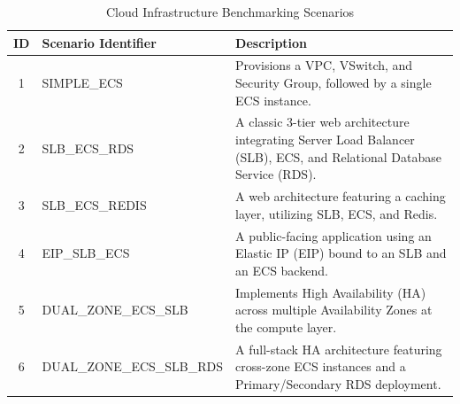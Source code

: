 \documentclass{article}
\theoremstyle{plain}
\theoremstyle{definition}
\theoremstyle{remark}
\begin{document}
\begin{table}[H]
\centering
\small
\renewcommand{\arraystretch}{1.3}
\begin{tabular}{|c|l|p{8.5cm}|}
\hline
\textbf{ID} & \textbf{Scenario Identifier} & \textbf{Description} \\ \hline
1 & SIMPLE\_ECS & Provisions a VPC, VSwitch, and Security Group, followed by a single ECS instance. \\ \hline
2 & SLB\_ECS\_RDS & A classic 3-tier web architecture integrating Server Load Balancer (SLB), ECS, and Relational Database Service (RDS). \\ \hline
3 & SLB\_ECS\_REDIS & A web architecture featuring a caching layer, utilizing SLB, ECS, and Redis. \\ \hline
4 & EIP\_SLB\_ECS & A public-facing application using an Elastic IP (EIP) bound to an SLB and an ECS backend. \\ \hline
5 & DUAL\_ZONE\_ECS\_SLB & Implements High Availability (HA) across multiple Availability Zones at the compute layer. \\ \hline
6 & DUAL\_ZONE\_ECS\_SLB\_RDS & A full-stack HA architecture featuring cross-zone ECS instances and a Primary/Secondary RDS deployment. \\ \hline
\end{tabular}
\caption{Cloud Infrastructure Benchmarking Scenarios}
\label{tab:aliyun_sceario}
\end{table}
\end{document}
